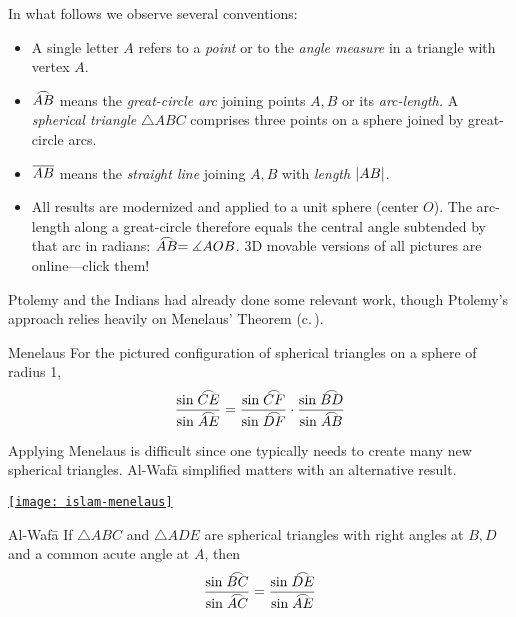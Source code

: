 \goodbreak



In what follows we observe several conventions:
\begin{itemize}\itemsep0pt
  \item A single letter $A$ refers to a \emph{point} or to the \emph{angle measure} in a triangle with vertex $A$.
  \item $\arc{AB}$ means the \emph{great-circle arc} joining points $A,B$ or its \emph{arc-length.} A \emph{spherical triangle} $\triangle ABC$ comprises three points on a sphere joined by great-circle arcs.
  \item $\overline{AB}$ means the \emph{straight line} joining $A,B$ with \emph{length} $\left| AB\right|$.
  \item All results are modernized and applied to a unit sphere (center $O$). The arc-length along a great-circle therefore equals the central angle subtended by that arc in radians: $\arc{AB}=\measuredangle AOB$. 3D movable versions of all pictures are online---click them! 
\end{itemize}

\begin{minipage}[t]{0.75\linewidth}\vspace{-5pt}
	Ptolemy and the Indians had already done some relevant work, though Ptolemy's approach relies heavily on Menelaus' Theorem (c.\,).
	
	\begin{thm*}{Menelaus}{}
		For the pictured configuration of spherical triangles on a sphere of radius 1,
		\[
			\frac{\sin\arc{CE}}{\sin\arc{AE}}=\frac{\sin\arc{CF}}{\sin\arc{DF}}\cdot\frac{\sin\arc{BD}}{\sin\arc{AB}}
		\]
	\end{thm*}
	
	Applying Menelaus is difficult since one typically needs to create many new spherical triangles. Al-Wafā simplified matters with an alternative result.
	\end{minipage}
	\hfill
	\begin{minipage}[t]{0.24\linewidth}\vspace{-5pt}
		\flushright
		\href{http://math.uci.edu/~ndonalds/math184/islam-menelaus.html}{\texttt{[image: islam-menelaus]}}
\end{minipage}
\medbreak




\begin{thm*}{Al-Wafā}{}
	If $\triangle ABC$ and $\triangle ADE$ are spherical triangles with right angles at $B,D$ and a common acute angle at $A$, then
	\[
		\frac{\sin\arc{BC}}{\sin\arc{AC}}=\frac{\sin\arc{DE}}{\sin \arc{AE}}
	\]
\end{thm*}

